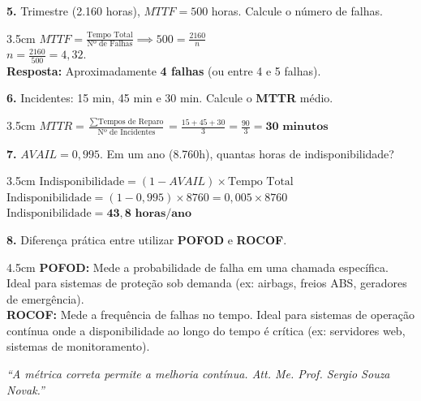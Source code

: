 \documentclass[12pt]{article}
\begin{document}
\newpage

\textbf{5.} Trimestre (2.160 horas), $MTTF = 500$ horas. Calcule o número de falhas.
\begin{resposta}{3.5cm}
    $MTTF = \frac{\text{Tempo Total}}{\text{Nº de Falhas}} \implies 500 = \frac{2160}{n}$ \\
    $n = \frac{2160}{500} = 4,32$. \\
    \textbf{Resposta:} Aproximadamente \textbf{4 falhas} (ou entre 4 e 5 falhas).
\end{resposta}

\vspace{0.5cm}

\textbf{6.} Incidentes: 15 min, 45 min e 30 min. Calcule o \textbf{MTTR} médio.
\begin{resposta}{3.5cm}
    $MTTR = \frac{\sum \text{Tempos de Reparo}}{\text{Nº de Incidentes}} = \frac{15 + 45 + 30}{3} = \frac{90}{3} = \mathbf{30 \text{ minutos}}$
\end{resposta}

\vspace{0.5cm}

\textbf{7.} $AVAIL = 0,995$. Em um ano (8.760h), quantas horas de indisponibilidade?
\begin{resposta}{3.5cm}
    $\text{Indisponibilidade} = (1 - AVAIL) \times \text{Tempo Total}$ \\
    $\text{Indisponibilidade} = (1 - 0,995) \times 8760 = 0,005 \times 8760$ \\
    $\text{Indisponibilidade} = \mathbf{43,8 \text{ horas/ano}}$
\end{resposta}

\vspace{0.5cm}

\textbf{8.} Diferença prática entre utilizar \textbf{POFOD} e \textbf{ROCOF}.
\begin{resposta}{4.5cm}
    \textbf{POFOD:} Mede a probabilidade de falha em uma chamada específica. Ideal para sistemas de proteção sob demanda (ex: airbags, freios ABS, geradores de emergência).\\
    \textbf{ROCOF:} Mede a frequência de falhas no tempo. Ideal para sistemas de operação contínua onde a disponibilidade ao longo do tempo é crítica (ex: servidores web, sistemas de monitoramento).
\end{resposta}

\vspace{0.8cm}

\begin{center}
    \textit{“A métrica correta permite a melhoria contínua. Att. Me. Prof. Sergio Souza Novak.”}
\end{center}
\end{document}
